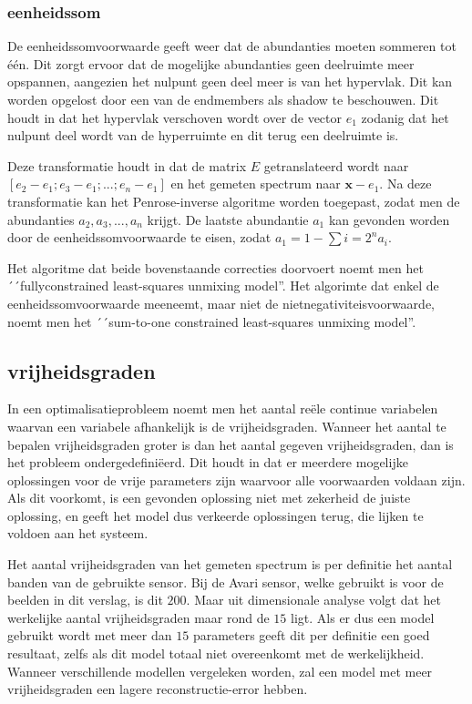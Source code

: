 \documentclass[12pt]{report}
\begin{document}
\subsubsection{eenheidssom}

De eenheidssomvoorwaarde geeft weer dat de abundanties moeten sommeren tot \'e\'en. Dit zorgt ervoor dat de mogelijke abundanties geen deelruimte meer opspannen, aangezien het nulpunt geen deel meer is van het hypervlak. Dit kan worden opgelost door een van de endmembers als shadow te beschouwen. Dit houdt in dat het hypervlak verschoven wordt over de vector $e_1$ zodanig dat het nulpunt deel wordt van de hyperruimte en dit terug een deelruimte is.

Deze transformatie houdt in dat de matrix $E$ getranslateerd wordt naar $[e_2-e_1;e_3-e_1;...;e_n-e_1]$ en het gemeten spectrum naar $\bm{x} - e_1$. Na deze transformatie kan het Penrose-inverse algoritme worden toegepast, zodat men de abundanties $a_2,a_3,...,a_n$ krijgt. De laatste abundantie $a_1$ kan gevonden worden door de eenheidssomvoorwaarde te eisen, zodat $a_1 = 1 - \sum{i=2}^{n} a_i$.

\vspace{5 mm}
Het algoritme dat beide bovenstaande correcties doorvoert noemt men het ´´fullyconstrained
least-squares unmixing model''. Het algorimte dat enkel de eenheidssomvoorwaarde meeneemt, maar niet de nietnegativiteisvoorwaarde, noemt men het ´´sum-to-one
constrained least-squares unmixing model''.

\subsection{vrijheidsgraden} \label{sec:vrij}

In een optimalisatieprobleem noemt men het aantal re\"ele continue variabelen waarvan een variabele afhankelijk is de vrijheidsgraden. Wanneer het aantal te bepalen vrijheidsgraden groter is dan het aantal gegeven vrijheidsgraden, dan is het probleem ondergedefini\"eerd. Dit houdt in dat er meerdere mogelijke oplossingen voor de vrije parameters zijn waarvoor alle voorwaarden voldaan zijn. Als dit voorkomt, is een gevonden oplossing niet met zekerheid de juiste oplossing, en geeft het model dus verkeerde oplossingen terug, die lijken te voldoen aan het systeem.

Het aantal vrijheidsgraden van het gemeten spectrum is per definitie het aantal banden van de gebruikte sensor. Bij de Avari sensor, welke gebruikt is voor de beelden in dit verslag, is dit $200$. Maar uit dimensionale analyse volgt dat het werkelijke aantal vrijheidsgraden maar rond de $15$ ligt. Als er dus een model gebruikt wordt met meer dan $15$ parameters geeft dit per definitie een goed resultaat, zelfs als dit model totaal niet overeenkomt met de werkelijkheid. Wanneer verschillende modellen vergeleken worden, zal een model met meer vrijheidsgraden een lagere reconstructie-error hebben. 
 
\end{document}
